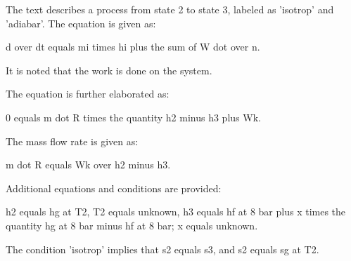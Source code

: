 The text describes a process from state 2 to state 3, labeled as 'isotrop' and 'adiabar'. The equation is given as:

d over dt equals mi times hi plus the sum of W dot over n.

It is noted that the work is done on the system. 

The equation is further elaborated as:

0 equals m dot R times the quantity h2 minus h3 plus Wk.

The mass flow rate is given as:

m dot R equals Wk over h2 minus h3.

Additional equations and conditions are provided:

h2 equals hg at T2,
T2 equals unknown,
h3 equals hf at 8 bar plus x times the quantity hg at 8 bar minus hf at 8 bar; x equals unknown.

The condition 'isotrop' implies that s2 equals s3, and s2 equals sg at T2.